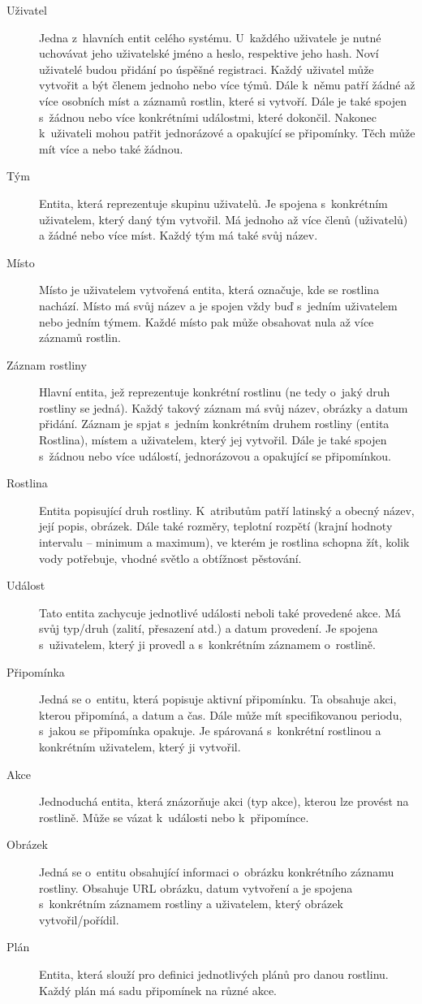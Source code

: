 \documentclass[thesis=M,czech]{FITthesis}[2019/12/23]
\begin{document}
\begin{description}
    \item[Uživatel] Jedna z~hlavních entit celého systému. U~každého uživatele je nutné uchovávat jeho uživatelské jméno a heslo, respektive jeho hash. Noví uživatelé budou přidání po úspěšné registraci. Každý uživatel může vytvořit a být členem jednoho nebo více týmů. Dále k~němu patří žádné až více osobních míst a záznamů rostlin, které si vytvoří. Dále je také spojen s~žádnou nebo více konkrétními událostmi, které dokončil. Nakonec k~uživateli mohou patřit jednorázové a opakující se připomínky. Těch může mít více a nebo také žádnou.
    \item[Tým] Entita, která reprezentuje skupinu uživatelů. Je spojena s~konkrétním uživatelem, který daný tým vytvořil. Má jednoho až více členů (uživatelů) a žádné nebo více míst. Každý tým má také svůj název.
    \item[Místo] Místo je uživatelem vytvořená entita, která označuje, kde se rostlina nachází. Místo má svůj název a je spojen vždy buď s~jedním uživatelem nebo jedním týmem. Každé místo pak může obsahovat nula až více záznamů rostlin.
    \item[Záznam rostliny] Hlavní entita, jež reprezentuje konkrétní rostlinu (ne tedy o~jaký druh rostliny se jedná). Každý takový záznam má svůj název, obrázky a datum přidání. Záznam je spjat s~jedním konkrétním druhem rostliny (entita Rostlina), místem a uživatelem, který jej vytvořil. Dále je také spojen s~žádnou nebo více událostí, jednorázovou a opakující se připomínkou.
    \item[Rostlina] Entita popisující druh rostliny. K~atributům patří latinský a obecný název, její popis, obrázek. Dále také rozměry, teplotní rozpětí (krajní hodnoty intervalu -- minimum a maximum), ve kterém je rostlina schopna žít, kolik vody potřebuje, vhodné světlo a obtížnost pěstování.
    \item[Událost] Tato entita zachycuje jednotlivé události neboli také provedené akce. Má svůj typ/druh (zalití, přesazení atd.) a datum provedení. Je spojena s~uživatelem, který ji provedl a s~konkrétním záznamem o~rostlině.
    \item[Připomínka] Jedná se o~entitu, která popisuje aktivní připomínku. Ta obsahuje akci, kterou připomíná, a datum a čas. Dále může mít specifikovanou periodu, s~jakou se připomínka opakuje. Je spárovaná s~konkrétní rostlinou a konkrétním uživatelem, který ji vytvořil.
    \item[Akce] Jednoduchá entita, která znázorňuje akci (typ akce), kterou lze provést na rostlině. Může se vázat k~události nebo k~připomínce.
    \item[Obrázek] Jedná se o~entitu obsahující informaci o~obrázku konkrétního záznamu rostliny. Obsahuje URL obrázku, datum vytvoření a je spojena s~konkrétním záznamem rostliny a uživatelem, který obrázek vytvořil/pořídil.
    \item[Plán] Entita, která slouží pro definici jednotlivých plánů pro danou rostlinu. Každý plán má sadu připomínek na různé akce.
\end{description}
\end{document}
